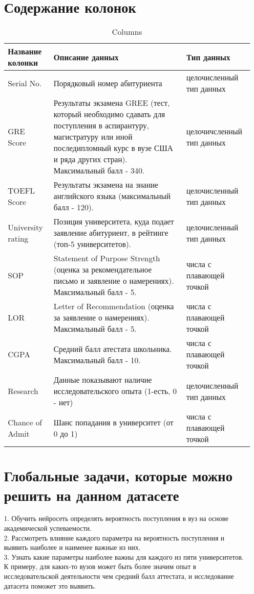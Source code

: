 \documentclass[12pt,a4paper]{article}
\begin{document}
\section{Содержание колонок}
\begin{table}[h]
\caption{Columns}

\begin{tabular}{|p{4cm}|p{8cm}|p{4cm}|}
	\hline Название колонки & Описание данных & Тип данных \\ \hline
	Serial No. & Порядковый номер абитуриента & целочисленный тип данных \\ \hline
	GRE Score & Результаты экзамена GREE (тест, который необходимо сдавать для поступления в аспирантуру, магистратуру или иной последипломный курс в вузе США и ряда других стран). Максимальный балл - 340. & целочичсленный тип данных \\ \hline
	TOEFL Score & Результаты экзамена на знание английского языка (максимальный балл - 120). & целочисленный тип данных \\ \hline
	University rating & Позиция университета, куда подает заявление абитуриент, в рейтинге (топ-5 университетов). & целочисленный тип данных \\ \hline
	SOP & Statement of Purpose Strength (оценка за рекомендательное письмо и заявление о намерениях). Максимальный балл - 5. & числа с плавающей точкой\\ \hline
	LOR & Letter of Recommendation (оценка за заявление о намерениях). Максимальный балл - 5. & числа с плавающей точкой\\ \hline
	CGPA & Средний балл атестата школьника. Максимальный балл - 10. & числа с плавающей точкой \\ \hline
	Research & Данные показывают наличие исследовательского опыта (1-есть, 0 - нет) & целочисленный тип данных \\ \hline
	Chance of Admit & Шанс попадания в университет (от 0 до 1) & числа с плавающей точкой \\ \hline


\end{tabular} 
\end{table}

\section{Глобальные задачи, которые можно решить на данном датасете}
1. Обучить нейросеть определять вероятность поступления в вуз на основе академической успеваемости.  \\

2. Рассмотреть влияние каждого параметра на вероятность поступления и выявить наиболее и наименее важные из них. \\

3. Узнать какие параметры наиболее важны для каждого из пяти университетов. К примеру, для каких-то вузов может быть более значим опыт в исследовательской деятельности чем средний балл аттестата, и исследование датасета поможет это выявить.

   
\end{document}
